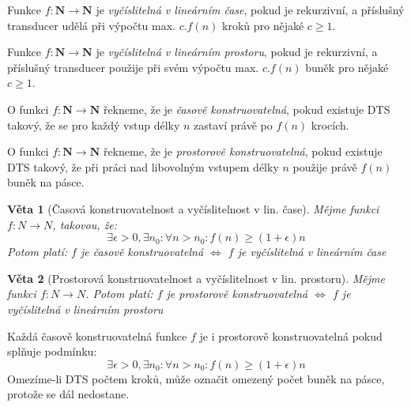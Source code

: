\documentclass[a4paper]{article}      %
\newtheorem{theorem}{Věta}[section]
\newenvironment{definition}[1][Definice]{\begin{trivlist}
\item[\hskip \labelsep {\bfseries #1}]}{\end{trivlist}}
\newenvironment{remark}[1][Pozorování]{\begin{trivlist}
\item[\hskip \labelsep {\bfseries #1}]}{\end{trivlist}}
\begin{document}
\begin{definition}[Vyčíslitelnost v čase]
Funkce $f: \mathbf{N} \rightarrow \mathbf{N}$ je \emph{vyčíslitelná v lineárním čase}, pokud je rekurzivní, a příslušný transducer udělá při výpočtu max. $c.f(n)$ kroků pro nějaké $c \geq 1$.
\end{definition}

\begin{definition}[Vyčíslitelnost v prostoru]
Funkce $f: \mathbf{N} \rightarrow \mathbf{N}$ je \emph{vyčíslitelná v lineárním prostoru}, pokud je rekurzivní, a příslušný transducer použije při svém výpočtu max. $c.f(n)$ buněk pro nějaké $c \geq 1$. 
\end{definition}

\begin{definition}[Časová konstruovatelnost]
O funkci $f: \mathbf{N} \rightarrow \mathbf{N}$ řekneme, že je \emph{časově konstruovatelná}, pokud existuje DTS takový,
že se pro každý vstup délky $n$ zastaví právě po $f(n)$ krocích.
\end{definition}

\begin{definition}[Prostorová konstruovatelnost]
O funkci $f: \mathbf{N} \rightarrow \mathbf{N}$ řekneme, že je \emph{prostorově konstruovatelná}, pokud existuje DTS takový, že při práci nad
libovolným vstupem délky $n$ použije právě $f(n)$ buněk na pásce.
\end{definition}

\begin{theorem}[Časová konstruovatelnost a vyčíslitelnost v lin. čase]
Mějme funkci $f: N \rightarrow N$, takovou, že:
\[
\exists \epsilon > 0, \exists n_0: \forall n > n_0: f(n) \geq (1+\epsilon)n
\]
Potom platí: $f$ je časově konstruovatelná $\Leftrightarrow$ $f$ je vyčíslitelná v lineárním čase
\end{theorem}

\begin{theorem}[Prostorová konstruovatelnost a vyčíslitelnost v lin. prostoru]
Mějme funkci $f: N \rightarrow N$. Potom platí: $f$ je prostorově konstruovatelná $\Leftrightarrow$ $f$ je vyčíslitelná v lineárním prostoru
\end{theorem}

\begin{remark}
Každá časově konstruovatelná funkce $f$ je i prostorově konstruovatelná pokud splňuje podmínku:
\[
\exists \epsilon > 0, \exists n_0: \forall n > n_0: f(n) \geq (1+\epsilon)n
\]
Omezíme-li DTS počtem kroků, může označit omezený počet buněk na pásce, protože se dál nedostane.
\end{remark}
\end{document}
